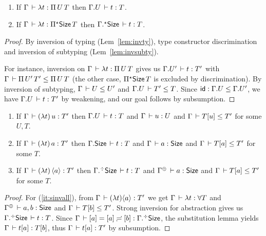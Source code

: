 \documentclass[acmlarge,review,anonymous]{acmart}\settopmatter{printfolios=true}
\begin{document}
\begin{lemma}
  \label{lem:invabs}
  \bla
  \begin{enumerate}
  \item   If $\Gamma \,\vdash \lambda t : \Pi\,U\, T$ then
  $\Gamma. U \,\vdash t : T$.
  \item   If $\Gamma \,\vdash \lambda t : \Pi{}^{\mathord{\star}}\mathsf{Size}\, T$ then
  $\Gamma.{}^{\mathord{\star}}\mathsf{Size} \,\vdash t : T$.
  \end{enumerate}
\end{lemma}
\begin{proof}
  By inversion of typing (Lem~\ref{lem:invty}), type constructor discrimination \label{lem:discr}
  and inversion of subtyping (Lem~\ref{lem:invsubty}).

  For instance, inversion on $\Gamma \,\vdash \lambda t : \Pi\,U\, T$ gives us $\Gamma. {U'} \,\vdash t : {T'}$ with $\Gamma \,\vdash \Pi\,U'\,{T'} \leq \Pi\,U\, T$ (the other case, $\Pi{}^{\mathord{\star}}\mathsf{Size}\, T$ is excluded by discrimination).  By inversion of subtyping, $\Gamma \,\vdash U \leq U'$ and $\Gamma. {U} \,\vdash T' \leq T$.  Since $\mathsf{id} : \Gamma. U \leq \Gamma. {U'}$, we have $\Gamma. U \,\vdash t : T'$ by weakening, and our goal follows by subsumption.
\end{proof}

\begin{lemma}
  \label{lem:stronginv}
  \bla
  \begin{enumerate}
  \item   If $\Gamma \,\vdash (\lambda t)\,u : T'$ then
  $\Gamma. U \,\vdash t : T$ and $\Gamma \,\vdash u : U$ and $\Gamma \,\vdash T[u] \leq T'$
  for some $U,T$.
  \item   If $\Gamma \,\vdash (\lambda t)\,a : T'$ then
  $\Gamma. \mathsf{Size} \,\vdash t : T$ and $\Gamma \,\vdash a : \mathsf{Size}$ and $\Gamma \,\vdash T[a] \leq T'$
  for some $T$.
  \item \label{it:sinvall}
  If $\Gamma \,\vdash (\lambda t)\,\langle a\rangle : T'$ then
  $\Gamma.{}^{\mathord{\div}}\mathsf{Size} \,\vdash t : T$ and $\resurrect \Gamma \der a : \Size$ and $\Gamma \,\vdash T[a] \leq T'$
  for some $T$.
  \end{enumerate}
\end{lemma}
\begin{proof}
  For (\ref{it:sinvall}), from $\Gamma \,\vdash (\lambda t) \langle a\rangle : T'$ we get $\Gamma \,\vdash \lambda t : \forall T$ and $\resurrect \Gamma \der a,b : \Size$ and $\Gamma \,\vdash T[b] \leq T'$.  Strong inversion for abstraction gives us $\Gamma.{}^{\mathord{\div}}\mathsf{Size} \,\vdash t : T$.  Since $\Gamma \,\vdash [a] = [a] \risingdotseq [b] : \Gamma.{}^{\mathord{\div}}\mathsf{Size}$,  the substitution lemma yields
$\Gamma \,\vdash t[a] : T[b]$, thus $\Gamma \,\vdash t[a] : T'$ by subsumption.
\end{proof}
\end{document}
